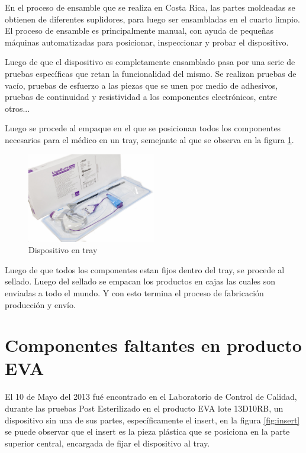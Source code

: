 \documentclass[12pt, twoside, letterpaper]{book}
\begin{document}
En el proceso de ensamble que se realiza en Costa Rica, las partes moldeadas se obtienen
de diferentes suplidores, para luego ser ensambladas en el cuarto limpio. El proceso de
ensamble es principalmente manual, con ayuda de peque\~nas m\'aquinas automatizadas para
posicionar, inspeccionar y probar el dispositivo. \par

Luego de que el dispositivo es completamente ensamblado pasa por una serie de pruebas
espec\'ificas que retan la funcionalidad del mismo. Se realizan pruebas de vac\'io, pruebas de esfuerzo a las piezas que se unen por medio de adhesivos, pruebas de continuidad
y resistividad a los componentes electr\'onicos, entre otros... \par


Luego se procede al empaque en el que se posicionan todos los componentes necesarios
para el m\'edico en un tray, semejante al que se observa en la figura \ref{fig:tray}.

\begin{figure}[H]
\centering
\includegraphics[width=0.5\textwidth]{trayImage}
\caption{Dispositivo en tray}
\label{fig:tray}
\end{figure}

Luego de que todos los componentes estan fijos dentro del tray, se procede al sellado. Luego del sellado se empacan los productos en cajas las cuales son enviadas a todo el mundo. Y con esto termina el proceso de fabricaci\'on producci\'on y env\'io.

\newpage
\section{Componentes faltantes en producto EVA}

El 10 de Mayo del 2013 fu\'e encontrado en el Laboratorio  de Control de Calidad, durante las pruebas Post Esterilizado en el producto EVA lote 13D10RB, un dispositivo sin una de sus partes, espec\'ificamente el insert, en la figura \ref{fig:insert} se puede observar que el insert es la pieza pl\'astica que se posiciona en la parte superior central, encargada de fijar el dispositivo al tray.
\end{document}
